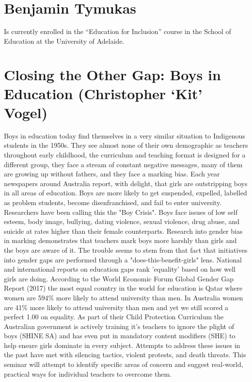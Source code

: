 \documentclass[twoside,12pt,a4paper,notitlepage]{memoir}
\begin{document}
\section*{Benjamin Tymukas}

Is currently enrolled in the ``Education for Inclusion'' course in the School of Education at the University of Adelaide.



\pagebreak
\section*{Closing the Other Gap: Boys in Education (Christopher `Kit' Vogel)}
\label{aut:vogel}

Boys in education today find themselves in a very similar situation to Indigenous students in the 1950s. They see almost none of their own demographic as teachers throughout early childhood, the curriculum and teaching format is designed for a different group, they face a stream of constant negative messages, many of them are growing up without fathers, and they face a marking bias.
Each year newspapers around Australia report, with delight, that girls are outstripping boys in all areas of education. Boys are more likely to get suspended, expelled, labelled as problem students, become disenfranchised, and fail to enter university. Researchers have been calling this the "Boy Crisis".
Boys face issues of low self esteem, body image, bullying, dating violence, sexual violence, drug abuse, and suicide at rates higher than their female counterparts. Research into gender bias in marking demonstrates that teachers mark boys more harshly than girls and the boys are aware of it.
The trouble seems to stem from that fact that initiatives into gender gaps are performed through a "does-this-benefit-girls" lens. National and international reports on education gaps rank 'equality' based on how well girls are doing. According to the World Economic Forum Global Gender Gap Report (2017) the most equal country in the world for education is Qatar where women are 594\% more likely to attend university than men. In Australia women are 41\% more likely to attend university than men and yet we still scored a perfect 1.00 on equality.
As part of their Child Protection Curriculum the Australian government is actively training it's teachers to ignore the plight of boys (SHINE SA) and has even put in mandatory content modifiers (SHE) to help ensure girls dominate in every subject.
Attempts to address these issues in the past have met with silencing tactics, violent protests, and death threats.
This seminar will attempt to identify specific areas of concern and suggest real-world, practical ways for individual teachers to overcome them.
\end{document}
